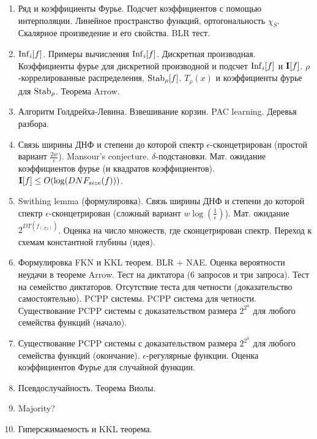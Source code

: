 \begin{enumerate}
    \item Ряд и коэффициенты Фурье. Подсчет коэффициентов с помощью интерполяции. Линейное пространство функций, ортогональность
        $\chi_S$. Скалярное произведение и его свойства. BLR тест.
    \item $\mathrm{Inf}_i[f]$. Примеры вычисления $\mathrm{Inf}_i[f]$. Дискретная производная. Коэффициенты фурье для дискретной производной и 
        подсчет $\mathrm{Inf}_i[f]$ и $\mathbf{I}[f]$. $\rho$-коррелированные распределения, $\mathrm{Stab}_{\rho}[f]$. $T_{\rho}(x)$ и коэффициенты фурье
        для $\mathrm{Stab}_{\rho}$. Теорема Arrow.
    \item Алгоритм Голдрейха-Левина. Взвешивание корзин. PAC learning. Деревья разбора.
    \item Связь ширины ДНФ и степени до которой спектр $\epsilon$-сконцетрирован (простой вариант
        $\frac{2w}{\epsilon}$). Mansour's conjecture. $\delta$-подстановки. Мат. ожидание коэффициентов фурье (и квадратов
        коэффициентов). $\mathbf{I}[f] \le O(\log(DNF_{size}(f)))$.
    \item Swithing lemma (формулировка). Связь ширины ДНФ и степени до которой спектр $\epsilon$-сконцетрирован (сложный вариант
        $w \log(\frac{1}{\epsilon})$). Мат. ожидание $2^{DT(f_{(J|z)})}$. Оценка на число множеств, где сконцетрирован
        спектр. Переход к схемам константной глубины (идея).
    \item Формулировка FKN и KKL теорем. BLR + NAE. Оценка вероятности неудачи в теореме Arrow. Тест на диктатора (6 запросов и
        три запроса). Тест на семейство диктаторов. Отсутствие теста для четности (доказательство самостоятельно). PCPP
        системы. PCPP система для четности. Существование PCPP системы с доказательством размера $2^{2^{n}}$ для любого семейства
        функций (начало).
    \item Существование PCPP системы с доказательством размера $2^{2^{n}}$ для любого семейства функций
        (окончание). $\epsilon$-регулярные функции. Оценка коэффициентов Фурье для случайной функции.
    \item Псевдослучайность. Теорема Виолы.
    \item Majority?
    \item Гиперсжимаемость и KKL теорема.
\end{enumerate}